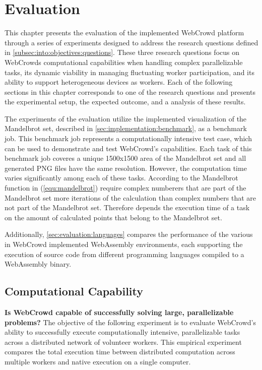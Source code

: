 \chapter{Evaluation}
\label{ch:evaluation}
This chapter presents the evaluation of the implemented WebCrowd platform through a series of experiments designed to address the research questions defined in \autoref{subsec:into:objectives:questions}. These three research questions focus on WebCrowds computational capabilities when handling complex parallelizable tasks, its dynamic viability in managing fluctuating worker participation, and its ability to support heterogeneous devices as workers. Each of the following sections in this chapter corresponds to one of the research questions and presents the experimental setup, the expected outcome, and a analysis of these results.

The experiments of the evaluation utilize the implemented visualization of the Mandelbrot set, described in \autoref{sec:implementation:benchmark}, as a benchmark job. This benchmark job represents a computationally intensive test case, which can be used to demonstrate and test WebCrowd's capabilities. Each task of this benchmark job coveres a unique 1500x1500 area of the Mandelbrot set and all generated \ac{PNG} files have the same resolution. However, the computation time varies significantly among each of these tasks. According to the Mandelbrot function in (\ref{equ:mandelbrot}) require complex numberers that are part of the Mandelbrot set more iterations of the calculation than complex numbers that are not part of the Mandelbrot set. Therefore depends the execution time of a task on the amount of calculated points that belong to the Mandelbrot set.

Additionally, \autoref{sec:evaluation:languages} compares the performance of the various in WebCrowd implemented WebAssembly environments, each supporting the execution of source code from different programming languages compiled to a WebAssembly binary.

\section{Computational Capability}
\label{sec:evaluation:computation}
\textbf{Is WebCrowd capable of successfully solving large, parallelizable problems?} 
\newline
The objective of the following experiment is to evaluate WebCrowd's ability to successfully execute computationally intensive, parallelizable tasks across a distributed network of volunteer workers. This empirical experiment compares the total execution time between distributed computation across multiple workers and native execution on a single computer.

